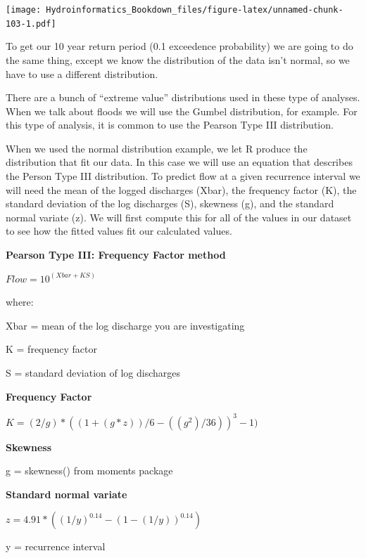 \documentclass[
]{book}
\begin{document}
\texttt{[image: Hydroinformatics\_Bookdown\_files/figure-latex/unnamed-chunk-103-1.pdf]}

To get our 10 year return period (0.1 exceedence probability) we are going to do the same thing, except we know the distribution of the data isn't normal, so we have to use a different distribution.

There are a bunch of ``extreme value'' distributions used in these type of analyses. When we talk about floods we will use the Gumbel distribution, for example. For this type of analysis, it is common to use the Pearson Type III distribution.

When we used the normal distribution example, we let R produce the distribution that fit our data. In this case we will use an equation that describes the Person Type III distribution. To predict flow at a given recurrence interval we will need the mean of the logged discharges (Xbar), the frequency factor (K), the standard deviation of the log discharges (S), skewness (g), and the standard normal variate (z). We will first compute this for all of the values in our dataset to see how the fitted values fit our calculated values.

\textbf{Pearson Type III: Frequency Factor method}

\(Flow = 10^(Xbar + KS)\)

where:

Xbar = mean of the log discharge you are investigating

K = frequency factor

S = standard deviation of log discharges

\textbf{Frequency Factor}

\(K = (2 / g) * ((1 +( g * z)) / 6 - ((g ^ 2) / 36)) ^ 3 - 1)\)

\textbf{Skewness}

g = skewness() from moments package

\textbf{Standard normal variate}

\(z = 4.91 * ((1 / y) ^ {0.14} - (1 - (1 / y)) ^ {0.14})\)

y = recurrence interval
\end{document}
